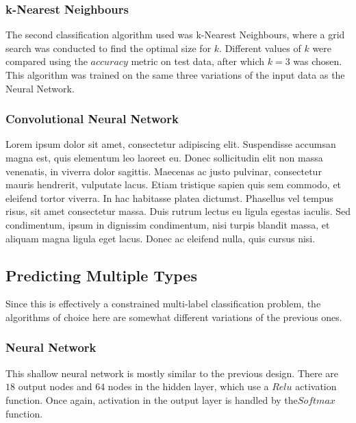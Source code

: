 \documentclass{winnower}
\begin{document}
\subsubsection{k-Nearest Neighbours}
The second classification algorithm used was k-Nearest Neighbours, where a grid search was conducted to find the optimal size for $k$.  Different values of $k$ were compared using the $accuracy$ metric on test data, after which $k = 3$ was chosen. This algorithm was trained on the same three variations of the input data as the Neural Network.

\subsubsection{Convolutional Neural Network}
Lorem ipsum dolor sit amet, consectetur adipiscing elit. Suspendisse accumsan magna est, quis elementum leo laoreet eu. Donec sollicitudin elit non massa venenatis, in viverra dolor sagittis. Maecenas ac justo pulvinar, consectetur mauris hendrerit, vulputate lacus. Etiam tristique sapien quis sem commodo, et eleifend tortor viverra. In hac habitasse platea dictumst. Phasellus vel tempus risus, sit amet consectetur massa. Duis rutrum lectus eu ligula egestas iaculis. Sed condimentum, ipsum in dignissim condimentum, nisi turpis blandit massa, et aliquam magna ligula eget lacus. Donec ac eleifend nulla, quis cursus nisi. 

\subsection{Predicting Multiple Types}

Since this is effectively a constrained multi-label classification problem, the algorithms of choice here are somewhat different variations of the previous ones.

\subsubsection{Neural Network}
This shallow neural network is mostly similar to the previous design. There are $18$ output nodes and $64$ nodes in the hidden layer, which use a $Relu$ activation function. Once again, activation in the output layer is handled by the$Softmax$ function.
\end{document}
